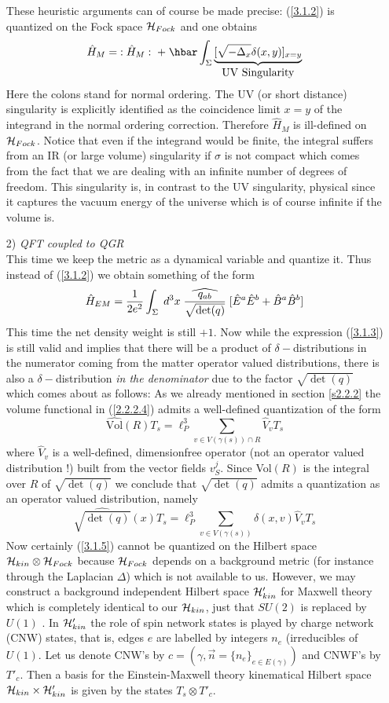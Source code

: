 \documentclass[12pt]{report}
\def\be{\begin{equation}}
\def\ee{\end{equation}}
\def\blue{\relax}
\def\red{\relax}
\def\green{\relax}
\begin{document}
\begin{itemize}
These heuristic arguments can of course be made precise: (\ref{3.1.2}) 
is quantized on the Fock space ${\cal H}_{Fock}$ and one obtains 
\be \label{3.1.4}
\hat{H}_M=\;:\hat{H}_M:\;+\;\hbar\int_\Sigma
\underbrace{[\sqrt{-\Delta_x} \delta(x,y)]_{x=y}}_{\mbox{{\red UV 
Singularity}}}
\ee
Here the colons stand for normal ordering. The UV (or short distance) 
singularity is explicitly identified as the coincidence limit $x=y$
of the integrand in the normal ordering correction. Therefore $\hat{H}_M$
is ill-defined on ${\cal H}_{Fock}$. Notice that even if the integrand 
would be finite, the integral suffers from an IR (or large volume)
singularity if $\sigma$ is not compact which comes from the fact that we 
are dealing with an infinite number of degrees of freedom. This 
singularity is, in contrast to the UV singularity, physical since it
captures the vacuum energy of the universe which is of course infinite if 
the volume is.
%
\item[2)] {\it QFT coupled to QGR}\\
This time we keep the metric as a dynamical variable and quantize it.
Thus instead of (\ref{3.1.2}) we obtain something of the form
\be \label{3.1.5}
\hat{H}_{EM}=\frac{1}{2 e^2}\int_\Sigma\; d^3x \; 
{\blue \widehat{\frac{q_{ab}}{\sqrt{\det(q)}}}}\;
{\green [\hat{E}^a \hat{E}^b+\hat{B}^a \hat{B}^b]}
\ee
This time the net density weight is still $+1$. Now while the expression
(\ref{3.1.3}) is still valid and implies that there will be a product
of $\delta-$distributions in the numerator coming from the matter operator
valued distributions, there is also a $\delta-$distribution {\it in the 
denominator} due to the factor $\sqrt{\det(q)}$ which comes about as 
follows: As we already mentioned in section \ref{s2.2.2} the volume 
functional in (\ref{2.2.2.4}) admits a well-defined quantization
of the form 
\be \label{3.1.6}
\widehat{\mbox{Vol}}(R) T_s=\ell_P^3
\sum_{v\in V(\gamma(s))\cap R} \hat{V}_v T_s
\ee
where $\hat{V}_v$ is a well-defined, dimensionfree operator (not an 
operator valued 
distribution !) built from the vector fields $v_S^j$. Since 
Vol$(R)$ is the integral over $R$ of $\sqrt{\det(q)}$ we conclude that 
$\sqrt{\det(q)}$ admits a quantization as an operator valued distribution,
namely
\be \label{3.1.7}
\widehat{\sqrt{\det(q)}}(x) T_s=\ell_P^3 \sum_{v\in V(\gamma(s))} 
\delta(x,v) \hat{V}_v T_s
\ee
Now certainly (\ref{3.1.5}) cannot be quantized on the Hilbert space 
${\cal H}_{kin}\otimes {\cal H}_{Fock}$ because ${\cal H}_{Fock}$
depends on a background metric (for instance through the Laplacian 
$\Delta$) which is not available to us. However, we may construct
a background independent Hilbert space ${\cal H}_{kin}'$ for Maxwell 
theory which is completely
identical to our ${\cal H}_{kin}$, just that $SU(2)$ is replaced by $U(1)$
\cite{41}. In ${\cal H}_{kin}'$ the role of spin network states is played
by charge network (CNW) states, that is, edges $e$ are labelled by 
integers $n_e$ (irreducibles of $U(1)$. Let us denote CNW's by 
$c=(\gamma,\vec{n}=\{n_e\}_{e\in E(\gamma)})$ and CNWF's by $T'_c$. Then a 
basis for the 
Einstein-Maxwell theory kinematical Hilbert space 
${\cal H}_{kin}\times {\cal H}'_{kin}$ is given by the states 
$T_s\otimes T'_c$. 


\end{itemize}
\end{document}
